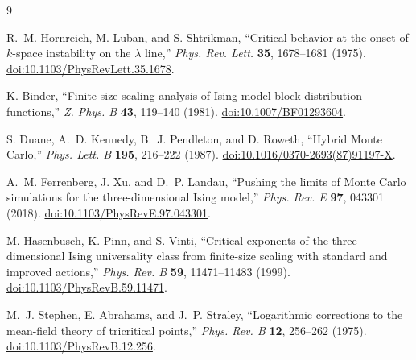 \documentclass[11pt]{article}
\begin{document}
\begin{thebibliography}{9}

R.~M. Hornreich, M. Luban, and S. Shtrikman,
``Critical behavior at the onset of $k$-space instability on the $\lambda$
line,'' \emph{Phys. Rev. Lett.} \textbf{35}, 1678--1681 (1975).
\href{https://doi.org/10.1103/PhysRevLett.35.1678}
{doi:10.1103/PhysRevLett.35.1678}.

K. Binder,
``Finite size scaling analysis of Ising model block distribution functions,''
\emph{Z. Phys. B} \textbf{43}, 119--140 (1981).
\href{https://doi.org/10.1007/BF01293604}{doi:10.1007/BF01293604}.

S. Duane, A.~D. Kennedy, B.~J. Pendleton, and D. Roweth,
``Hybrid Monte Carlo,'' \emph{Phys. Lett. B} \textbf{195}, 216--222 (1987).
\href{https://doi.org/10.1016/0370-2693(87)91197-X}
{doi:10.1016/0370-2693(87)91197-X}.

A.~M. Ferrenberg, J. Xu, and D.~P. Landau,
``Pushing the limits of Monte Carlo simulations for the three-dimensional
Ising model,'' \emph{Phys. Rev. E} \textbf{97}, 043301 (2018).
\href{https://doi.org/10.1103/PhysRevE.97.043301}
{doi:10.1103/PhysRevE.97.043301}.

M. Hasenbusch, K. Pinn, and S. Vinti,
``Critical exponents of the three-dimensional Ising universality class from
finite-size scaling with standard and improved actions,''
\emph{Phys. Rev. B} \textbf{59}, 11471--11483 (1999).
\href{https://doi.org/10.1103/PhysRevB.59.11471}
{doi:10.1103/PhysRevB.59.11471}.

M.~J. Stephen, E. Abrahams, and J.~P. Straley,
``Logarithmic corrections to the mean-field theory of tricritical points,''
\emph{Phys. Rev. B} \textbf{12}, 256--262 (1975).
\href{https://doi.org/10.1103/PhysRevB.12.256}
{doi:10.1103/PhysRevB.12.256}.

\end{thebibliography}
\end{document}
